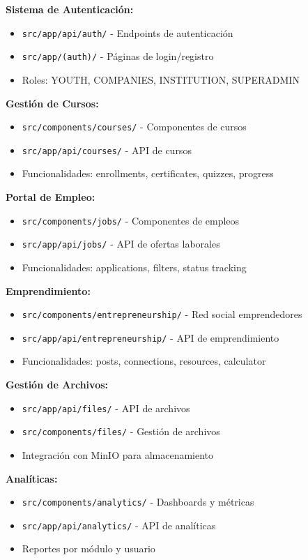 \documentclass[12pt,a4paper]{article}
\begin{document}
\textbf{Sistema de Autenticación:}
\begin{itemize}
    \item \texttt{src/app/api/auth/} - Endpoints de autenticación
    \item \texttt{src/app/(auth)/} - Páginas de login/registro
    \item Roles: YOUTH, COMPANIES, INSTITUTION, SUPERADMIN
\end{itemize}

\textbf{Gestión de Cursos:}
\begin{itemize}
    \item \texttt{src/components/courses/} - Componentes de cursos
    \item \texttt{src/app/api/courses/} - API de cursos
    \item Funcionalidades: enrollments, certificates, quizzes, progress
\end{itemize}

\textbf{Portal de Empleo:}
\begin{itemize}
    \item \texttt{src/components/jobs/} - Componentes de empleos
    \item \texttt{src/app/api/jobs/} - API de ofertas laborales
    \item Funcionalidades: applications, filters, status tracking
\end{itemize}

\textbf{Emprendimiento:}
\begin{itemize}
    \item \texttt{src/components/entrepreneurship/} - Red social emprendedores
    \item \texttt{src/app/api/entrepreneurship/} - API de emprendimiento
    \item Funcionalidades: posts, connections, resources, calculator
\end{itemize}

\textbf{Gestión de Archivos:}
\begin{itemize}
    \item \texttt{src/app/api/files/} - API de archivos
    \item \texttt{src/components/files/} - Gestión de archivos
    \item Integración con MinIO para almacenamiento
\end{itemize}

\textbf{Analíticas:}
\begin{itemize}
    \item \texttt{src/components/analytics/} - Dashboards y métricas
    \item \texttt{src/app/api/analytics/} - API de analíticas
    \item Reportes por módulo y usuario
\end{itemize}
\end{document}
